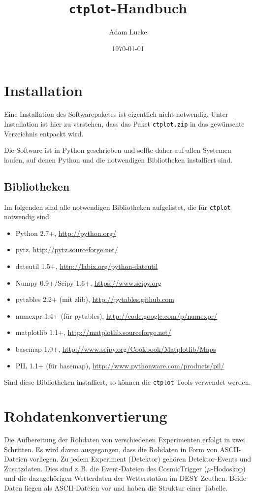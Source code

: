 \documentclass[version=last,
	a4paper,			%
	pagesize, 			%
	11pt,				%
	BCOR1cm,			%
	DIV12,	 			%
	pointlessnumbers,   %
	halfparskip,		%
]{scrreprt}
\newcommand{\zb}{z.\,B.\xspace}
\begin{document}
\title{\texttt{ctplot}-Handbuch}
\author{Adam Lucke}
\date{\today}
\maketitle

\tableofcontents
\chapter{Installation}
Eine Installation des Softwarepaketes ist eigentlich nicht notwendig. Unter Installation ist hier zu verstehen, dass das Paket \texttt{ctplot.zip} in das gewünschte Verzeichnis entpackt wird.

Die Software ist in Python geschrieben und sollte daher auf allen Systemen laufen, auf denen Python und die notwendigen Bibliotheken installiert sind.

\section{Bibliotheken}
Im folgenden sind alle notwendigen Bibliotheken aufgelistet, die für \texttt{ctplot} notwendig sind.
\begin{itemize}
  \item Python 2.7+, \url{http://python.org/}
  \item pytz, \url{http://pytz.sourceforge.net/}
  \item dateutil 1.5+, \url{http://labix.org/python-dateutil}
  \item Numpy 0.9+/Scipy 1.6+, \url{https://www.scipy.org}
  \item pytables 2.2+ (mit zlib), \url{http://pytables.github.com}
  \item numexpr 1.4+ (für pytables), \url{http://code.google.com/p/numexpr/}
  \item matplotlib 1.1+, \url{http://matplotlib.sourceforge.net/}
  \item basemap 1.0+, \url{http://www.scipy.org/Cookbook/Matplotlib/Maps}
  \item PIL 1.1+ (für basemap), \url{http://www.pythonware.com/products/pil/}
\end{itemize}

Sind diese Bibliotheken installiert, so können die \texttt{ctplot}-Tools verwendet werden.


\chapter{Rohdatenkonvertierung}
Die Aufbereitung der Rohdaten von verschiedenen Experimenten erfolgt in zwei Schritten. Es wird davon ausgegangen, dass die Rohdaten in Form von ASCII-Dateien vorliegen. Zu jedem Experiment (Detektor) gehören Detektor-Events und Zusatzdaten. Dies sind \zb die Event-Dateien des CosmicTrigger ($\mu$-Hodoskop) und die dazugehörigen Wetterdaten der Wetterstation im DESY Zeuthen. Beide Daten liegen als ASCII-Dateien vor und haben die Struktur einer Tabelle.
\end{document}
